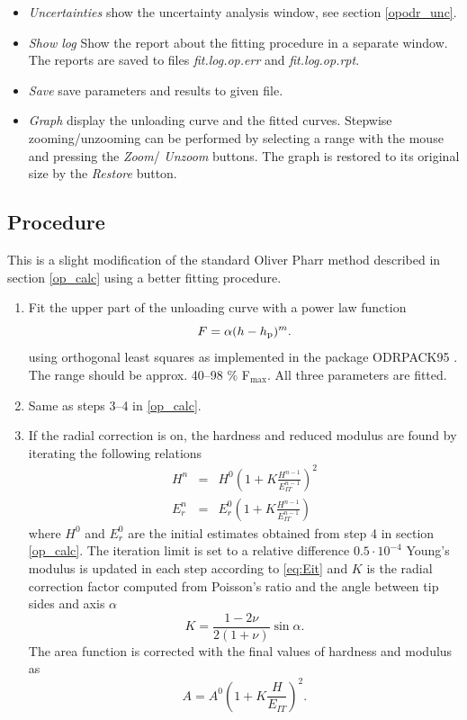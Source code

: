 \begin{itemize}
 \item \emph{Uncertainties} show the uncertainty analysis window, see section \ref{opodr_unc}.
 \item \emph{Show log} Show the report about the fitting procedure in a separate window.  The reports are saved to files \emph{fit.log.op.err} and \emph{fit.log.op.rpt}. 
 \item \emph{Save} save parameters and results to given file. 
 \item \emph{Graph} display the unloading curve and the fitted curves. Stepwise zooming/unzooming can be performed by selecting a range with the mouse and pressing the \emph{Zoom}/ \emph{Unzoom} buttons. The graph is restored to its original size by the \emph{Restore} button.
\end{itemize}

\subsection{Procedure} \label{opodr_calc}
This is a slight modification of the standard Oliver Pharr method described in section \ref{op_calc} using a better fitting procedure. 
\begin{enumerate} 
 \item 
 Fit the upper part of the unloading curve with a power law function
$$
F = \alpha (h - h_\mathrm{p})^m.
$$
using orthogonal least squares as implemented in the package ODRPACK95 \cite{odrpack95}. The range should be approx. 40--98 \% F$_\mathrm{max}$. All three parameters are fitted.
\item  Same as steps 3--4 in \ref{op_calc}.
\item If the radial correction is on, the hardness and reduced modulus are found by iterating the following relations
\begin{eqnarray}
 H^n &=& H^0 \left(1+K \frac{H^{n-1}}{E_{IT}^{n-1}}\right)^2 \\
 E_r^n &=& E_r^0 \left(1+K \frac{H^{n-1}}{E_{IT}^{n-1}}\right)
\end{eqnarray}
where $H^0$ and $E_r^0$ are the initial estimates obtained from step 4 in section \ref{op_calc}. The iteration limit is set to a relative difference $0.5 \cdot 10^{-4}$
Young's modulus is updated in each step according to \eqref{eq:Eit} and $K$ is the radial correction factor computed from Poisson's ratio and the angle between tip sides and axis $\alpha$
\begin{equation}
 K = \frac{1-2 \nu}{2(1+\nu)} \sin \alpha.
\end{equation}
The area function is corrected with the final values of hardness and modulus as 
\begin{equation}
 A = A^0 \left(1+K \frac{H}{E_{IT}}\right)^2.
\end{equation}




\end{enumerate}
